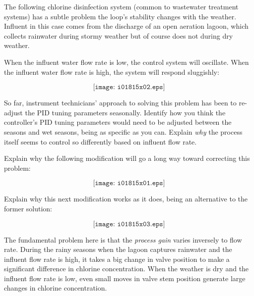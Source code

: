 

The following chlorine disinfection system (common to wastewater treatment systems) has a subtle problem the loop's stability changes with the weather.  Influent in this case comes from the discharge of an open aeration lagoon, which collects rainwater during stormy weather but of course does not during dry weather.  

When the influent water flow rate is low, the control system will oscillate.  When the influent water flow rate is high, the system will respond sluggishly:

$$\texttt{[image: i01815x02.eps]}$$

So far, instrument technicians' approach to solving this problem has been to re-adjust the PID tuning parameters seasonally.  Identify how you think the controller's PID tuning parameters would need to be adjusted between the seasons and wet seasons, being as specific as you can.  Explain {\it why} the process itself seems to control so differently based on influent flow rate.

\vskip 10pt

Explain why the following modification will go a long way toward correcting this problem:

$$\texttt{[image: i01815x01.eps]}$$

\filbreak

Explain why this next modification works as it does, being an alternative to the former solution:

$$\texttt{[image: i01815x03.eps]}$$







The fundamental problem here is that the {\it process gain} varies inversely to flow rate.  During the rainy seasons when the lagoon captures rainwater and the influent flow rate is high, it takes a big change in valve position to make a significant difference in chlorine concentration.  When the weather is dry and the influent flow rate is low, even small moves in valve stem position generate large changes in chlorine concentration.

\vskip 10pt

